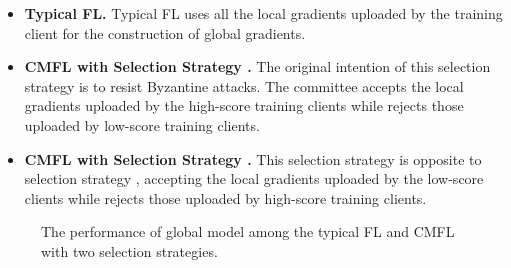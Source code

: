 \documentclass[10pt,journal,compsoc]{IEEEtran}
\begin{document}
\begin{itemize}
	\item \textbf{Typical FL.} Typical FL uses all the local gradients uploaded by the training client for the construction of global gradients.
	\item \textbf{CMFL with Selection Strategy \uppercase\expandafter{}.} The original intention of this selection strategy is to resist Byzantine attacks. The committee accepts the local gradients uploaded by the high-score training clients while rejects those uploaded by low-score training clients.
	\item \textbf{CMFL with Selection Strategy \uppercase\expandafter{}.} This selection strategy is opposite to selection strategy \uppercase\expandafter{}, accepting the local gradients uploaded by the low-score clients while rejects those uploaded by high-score training clients.
\end{itemize}

\begin{figure*}[htbp]
	\centering
	

	
	\centering
	\caption{The performance of global model among the typical FL and CMFL with two selection strategies.}
	\label{fig:CMFL_FL_strategy}
\end{figure*}
\end{document}
